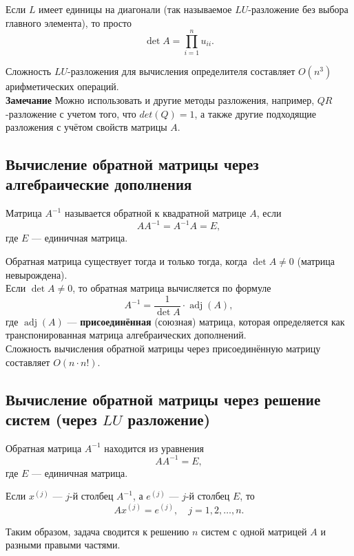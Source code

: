 Если $L$ имеет единицы на диагонали (так называемое $LU$-разложение без выбора главного элемента), то просто  
\[
\det A = \prod_{i=1}^n u_{ii}.
\]

Сложность $LU$-разложения для вычисления определителя составляет $O(n^3)$ арифметических операций.\\

\textbf{Замечание} Можно использовать и другие методы разложения, например, $QR$-разложение с учетом того, что $det(Q)=1$, а также другие подходящие разложения с учётом свойств матрицы $A$. 

\subsection{Вычисление обратной матрицы через алгебраические дополнения}

Матрица $A^{-1}$ называется обратной к квадратной матрице $A$, если
\[
A A^{-1} = A^{-1} A = E,
\]
где $E$ — единичная матрица.

Обратная матрица существует тогда и только тогда, когда $\det A \neq 0$ (матрица невырождена).\\

Если $\det A \neq 0$, то обратная матрица вычисляется по формуле
\[
A^{-1} = \frac{1}{\det A} \cdot \operatorname{adj}(A),
\]
где $\operatorname{adj}(A)$ — \textbf{присоединённая} (союзная) матрица, которая определяется как транспонированная матрица алгебраических дополнений.\\

Сложность вычисления обратной матрицы через присоединённую матрицу составляет $O(n \cdot n!)$.

\subsection{Вычисление обратной матрицы через решение систем (через $LU$ разложение)}

Обратная матрица $A^{-1}$ находится из уравнения
\[
A A^{-1} = E,
\]
где $E$ — единичная матрица.

Если $x^{(j)}$ — $j$-й столбец $A^{-1}$, а $e^{(j)}$ — $j$-й столбец $E$, то
\[
A x^{(j)} = e^{(j)}, \quad j = 1, 2, \dots, n.
\]

Таким образом, задача сводится к решению $n$ систем с одной матрицей $A$ и разными правыми частями.

